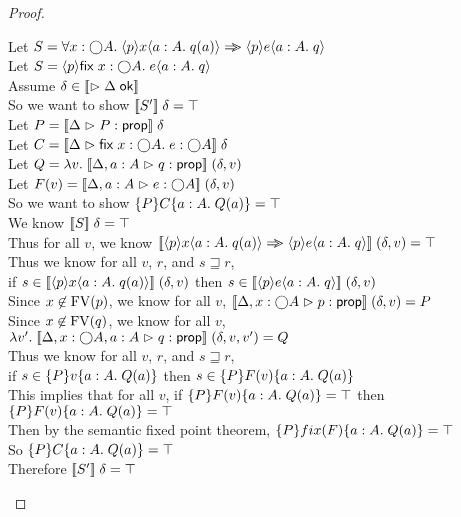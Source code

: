 \begin{proof}
  \begin{tabbedproof}
    \oo Let $S = \forall x:\monad{A}.\; \mspec{p}x{a:A}{q(a)} \specimp \mspec{p}{e}{a:A}{q}$\\
    \oo Let $S = \mspec{p}{\fix{x:\monad{A}}{e}}{a:A}{q}$ \\
    \oo Assume $\delta \in \interp{\judgeACtx{\Delta}}$ \\
    \ooo So we want to show $\interp{S'}\;\delta = \top$ \\
    \ooo Let $P = \interp{\judgeA{P}{\assert}}\;\delta$ \\
    \ooo Let $C = \interp{\judgeA{\fix{x:\monad{A}}{e}}{\monad{A}}}\;\delta$ \\
    \ooo Let $Q = \semfun{v}{\interp{\judgeA[\Delta,a:A]{q}{\assert}}\;(\delta,v)}$ \\
    \ooo Let $F(v) = \interp{\judgeA[\Delta,a:A]{e}{\monad{A}}}\;(\delta,v)$ \\
    \ooo So we want to show $\spec{P}{C}{a:A}{Q(a)} = \top$ \\
    \ooo We know $\interp{S}\;\delta = \top$ \\
    \ooo Thus for all $v$, we know $\interp{\mspec{p}x{a:A}{q(a)} \specimp \mspec{p}{e}{a:A}{q}}\;(\delta,v) = \top$ \\
    \ooo Thus we know for all $v$, $r$, and $s \sqsupseteq r$, \\
    \ooox if $s \in \interp{\mspec{p}x{a:A}{q(a)}}\;(\delta,v)$ then $s \in \interp{\mspec{p}{e}{a:A}{q}}\;(\delta,v)$ \\
    \ooo Since $x \not\in \FV{p}$, we know for all $v$, 
         $\interp{\judgeA[\Delta,x:\monad{A}]{p}{\assert}}\;(\delta,v) = P$ \\
    \ooo Since $x \not\in \FV{q}$, we know for all $v$, 
         $\semfun{v'}{\interp{\judgeA[\Delta,x:\monad{A}, a:A]{q}{\assert}}\;(\delta,v,v')} = Q$ \\
    \ooo Thus we know for all $v$, $r$, and $s \sqsupseteq r$, \\
    \ooox if $s \in  \spec{P}{v}{a:A}{Q(a)}$ then 
             $s \in \spec{P}{F(v)}{a:A}{Q(a)}$ \\
    \ooo This implies that for all $v$, if $\spec{P}{F(v)}{a:A}{Q(a)} = \top $ 
                                        then $\spec{P}{F(v)}{a:A}{Q(a)} = \top$ \\
    \ooo Then by the semantic fixed point theorem, 
          $\spec{P}{fix(F)}{a:A}{Q(a)} = \top$ \\
    \ooo So $\spec{P}{C}{a:A}{Q(a)} = \top$ \\
    \ooo Therefore $\interp{S'}\;\delta = \top$ \\
  \end{tabbedproof}
\end{proof}


